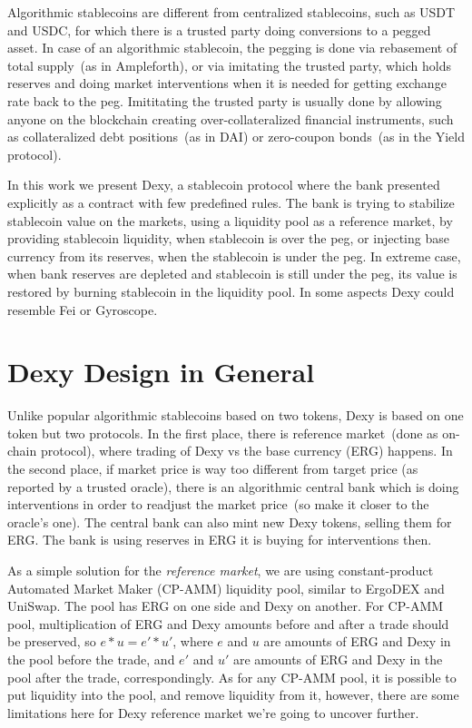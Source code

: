 \documentclass{article}   %
\newcommand{\authnote}[2]{\marginpar{\parbox{\marginparwidth}{\tiny %
  \textsf{#1 {\textcolor{blue}{notes: #2}}}}}%
  \textcolor{blue}{\textbf{\dag}}}
\newcommand{\authnote}[2]{
  \textsf{#1 \textcolor{blue}{: #2}}}
\newcommand{\authnote}[2]{}
\newcommand{\knote}[1]{{\authnote{\textcolor{green}{Alex notes}}{#1}}}
\newcommand{\bc}{ERG}
\newcommand{\dx}{Dexy}
\begin{document}
Algorithmic stablecoins are different from centralized stablecoins, such as USDT and USDC, for which there is a trusted party doing conversions to a pegged asset. In case of an algorithmic stablecoin, the 
pegging is done via rebasement of total supply~(as in Ampleforth), or via imitating the trusted party, which holds reserves and doing market interventions when it is needed for getting exchange rate back to the peg. Imititating the trusted party is usually done by allowing anyone on the blockchain creating over-collateralized financial instruments, such as collateralized debt positions~(as 
in DAI) or zero-coupon bonds~(as in the Yield protocol).

\knote{add links to the paragraph above}

In this work we present \dx{}, a stablecoin protocol where the bank presented explicitly as a contract with few predefined rules. The bank is trying to stabilize stablecoin value on the markets, using a liquidity pool as a reference market, by providing stablecoin liquidity, when stablecoin is over the peg, or injecting base currency from its reserves, when the stablecoin is under the peg. In extreme case, when bank reserves are depleted and stablecoin is still under the peg, its value is restored by burning stablecoin in the liquidity pool. In some aspects \dx{} could resemble Fei or Gyroscope. \knote{make comparison subsection}  


\section{\dx{} Design in General}

Unlike popular algorithmic stablecoins based on two tokens, \dx{} is based on one token but two protocols. In the first place, 
there is reference market~(done as on-chain protocol), where trading of \dx{} vs the base currency (\bc{}) happens. In the second place, if market price is way too different from target price (as reported by a trusted oracle), there is an algorithmic central bank which is doing interventions in order to readjust the market price~(so make it closer to the oracle's one). The central bank can also mint new \dx{} tokens, selling them for \bc{}. The bank is using reserves in \bc{} it is buying for interventions then. 

As a simple solution for the {\em reference market}, we are using constant-product Automated Market Maker (CP-AMM) liquidity pool, similar to ErgoDEX and UniSwap. The pool has \bc{} on one side and \dx{} on another. For CP-AMM pool, multiplication of \bc{} and \dx{} amounts before and after a trade should be preserved, so $e * u = e' * u'$, where $e$ and $u$ are amounts of \bc{} and \dx{} in the pool before the trade, and $e'$ and $u'$ are amounts of \bc{} and \dx{} in the pool after the trade, correspondingly. As for any CP-AMM pool, it is possible to put liquidity into the pool, and remove liquidity from it, however, there are some limitations here for \dx{} reference market we're going to uncover further. 
\end{document}

